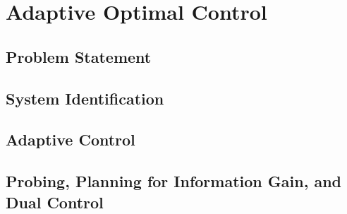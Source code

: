 \newpage

\section{Adaptive Optimal Control}


\subsection{Problem Statement}


\subsection{System Identification}


\subsection{Adaptive Control}


\subsection{Probing, Planning for Information Gain, and Dual Control}

